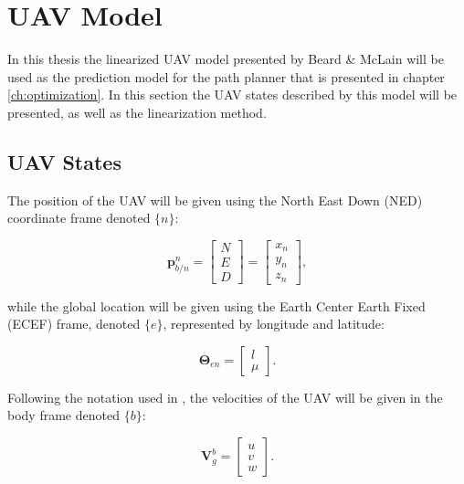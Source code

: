 \section{UAV Model}
\label{sec:model}

In this thesis the linearized UAV model presented by Beard \& McLain \cite{uavBEARD} will be used as the prediction model for the path planner that is presented in chapter \ref{ch:optimization}. In this section the UAV states described by this model will be presented, as well as the linearization method.

\subsection{UAV States}
The position of the UAV will be given using the North East Down (NED) coordinate frame denoted $\{n\}$:

\begin{equation}
	\mathbf{p}_{b/n}^n =
	\begin{bmatrix}
		N \\ E \\ D
	\end{bmatrix}
	=
	\begin{bmatrix}
		x_n \\ y_n \\ z_n
	\end{bmatrix},
\end{equation}

while the global location will be given using the Earth Center Earth Fixed (ECEF) frame, denoted $\{e\}$, represented by longitude and latitude:

\begin{equation}
	\bm{\Theta}_{en} =
	\begin{bmatrix}
		l \\ \mu
	\end{bmatrix}.
\end{equation} 

Following the notation used in \cite{uavBEARD}, the velocities of the UAV will be given in the body frame denoted $\{b\}$:

\begin{equation}
	\mathbf{V}^b_g =
	\begin{bmatrix}
		u \\ v \\ w
	\end{bmatrix}.
\end{equation}

